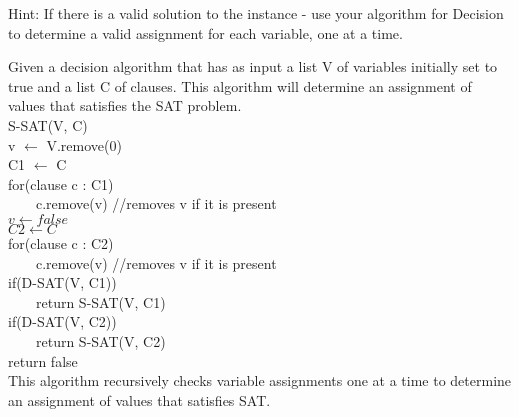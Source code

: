 \begin{questions}
  Hint: If there is a valid solution to the \SAT instance - use your algorithm
  for Decision \SAT to determine a valid assignment for each variable, one at
  a time.
  \begin{solution}
    Given a decision \SAT algorithm that has as input a list V of variables
    initially set to true and a list C of clauses. This algorithm will determine
    an assignment of values that satisfies the SAT problem. \\

    S-SAT(V, C)\\
    v $\gets$ V.remove(0)\\
    C1 $\gets$ C\\
    for(clause c : C1)\\
    \ \ \ \ c.remove(v) //removes v if it is present\\
    $v \gets false$\\
    $C2 \gets C$\\
    for(clause c : C2)\\
    \ \ \ \ c.remove(v) //removes v if it is present\\

    if(D-SAT(V, C1))\\
    \ \ \ \ return S-SAT(V, C1)\\
    if(D-SAT(V, C2))\\
    \ \ \ \ return S-SAT(V, C2)\\
    return false\\

    This algorithm recursively checks variable assignments one at a time to
    determine an assignment of values that satisfies SAT.  


\end{solution}
\end{questions}
